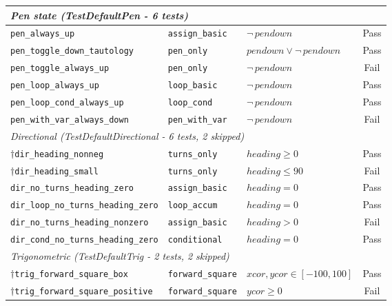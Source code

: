 {\begin{longtable}{p{} p{} p{} c}
\midrule
\multicolumn{4}{l}{\textit{Pen state (TestDefaultPen - 6 tests)}} \\
\midrule
\texttt{pen\_always\_up}                   & \texttt{assign\_basic}   & $\neg\,\mathit{pendown}$  & Pass \\
\texttt{pen\_toggle\_down\_tautology}      & \texttt{pen\_only}       & $\mathit{pendown} \lor \neg\,\mathit{pendown}$ & Pass \\
\texttt{pen\_toggle\_always\_up}           & \texttt{pen\_only}       & $\neg\,\mathit{pendown}$  & Fail \\
\texttt{pen\_loop\_always\_up}             & \texttt{loop\_basic}     & $\neg\,\mathit{pendown}$  & Pass \\
\texttt{pen\_loop\_cond\_always\_up}       & \texttt{loop\_cond}      & $\neg\,\mathit{pendown}$  & Pass \\
\texttt{pen\_with\_var\_always\_down}      & \texttt{pen\_with\_var}  & $\neg\,\mathit{pendown}$  & Fail \\

\midrule
\multicolumn{4}{l}{\textit{Directional (TestDefaultDirectional - 6 tests, 2 skipped)}} \\
\midrule
$\dagger$\;\texttt{dir\_heading\_nonneg}   & \texttt{turns\_only}     & $\mathit{heading} \geq 0$ & Pass \\
$\dagger$\;\texttt{dir\_heading\_small}    & \texttt{turns\_only}     & $\mathit{heading} \leq 90$& Fail \\
\texttt{dir\_no\_turns\_heading\_zero}     & \texttt{assign\_basic}   & $\mathit{heading} = 0$   & Pass \\
\texttt{dir\_loop\_no\_turns\_heading\_zero} & \texttt{loop\_accum}   & $\mathit{heading} = 0$   & Pass \\
\texttt{dir\_no\_turns\_heading\_nonzero}  & \texttt{assign\_basic}   & $\mathit{heading} > 0$   & Fail \\
\texttt{dir\_cond\_no\_turns\_heading\_zero} & \texttt{conditional}   & $\mathit{heading} = 0$   & Pass \\

\midrule
\multicolumn{4}{l}{\textit{Trigonometric (TestDefaultTrig - 2 tests, 2 skipped)}} \\
\midrule
$\dagger$\;\texttt{trig\_forward\_square\_box} & \texttt{forward\_square} & $\mathit{xcor},\mathit{ycor} \in [-100,100]$ & Pass \\
$\dagger$\;\texttt{trig\_forward\_square\_positive} & \texttt{forward\_square} & $\mathit{ycor} \geq 0$ & Fail \\

\end{longtable}
}


